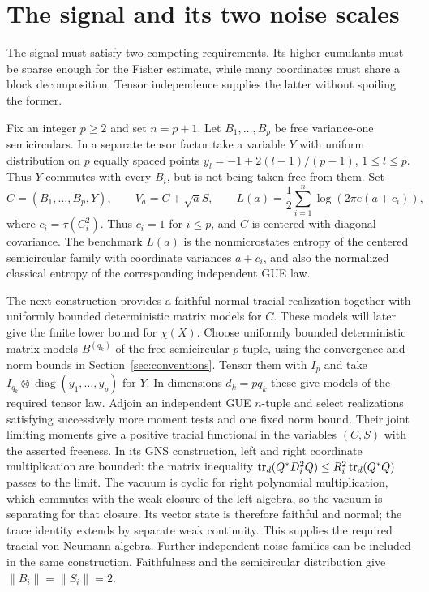 \section{The signal and its two noise scales}\label{sec:signal}

The signal must satisfy two competing requirements. Its higher cumulants
must be sparse enough for the Fisher estimate, while many coordinates
must share a block decomposition. Tensor independence supplies the latter
without spoiling the former.

Fix an integer $p\geq2$ and set $n=p+1$. Let $B_1,\ldots,B_p$ be free
variance-one semicirculars. In a separate tensor factor take a variable
$Y$ with uniform distribution on $p$ equally spaced points
$y_l=-1+2(l-1)/(p-1)$, $1\leq l\leq p$. Thus $Y$ commutes with every
$B_i$, but is not being taken free from them. Set
\[
 C=(B_1,\ldots,B_p,Y),\qquad V_a=C+\sqrt a S,\qquad
 L(a)=\frac12\sum_{i=1}^n\log(2\pi e(a+c_i)),
\]
where $c_i=\tau(C_i^2)$. Thus $c_i=1$ for $i\leq p$, and $C$ is
centered with diagonal covariance.
The benchmark $L(a)$ is the nonmicrostates entropy of the centered
semicircular family with coordinate variances $a+c_i$, and also the
normalized classical entropy of the corresponding independent GUE law.

The next construction provides a faithful normal tracial realization
together with uniformly bounded deterministic matrix models for $C$.
These models will later give the finite lower bound for $\chi(X)$.
Choose uniformly bounded deterministic matrix models
$B^{(q_k)}$ of the free semicircular $p$-tuple, using the convergence and
norm bounds in Section~\ref{sec:conventions}. Tensor them with $I_p$ and
take $I_{q_k}\otimes\operatorname{diag}(y_1,\ldots,y_p)$ for $Y$.
In dimensions $d_k=pq_k$ these give models of the required tensor law.
Adjoin an independent GUE $n$-tuple and select realizations satisfying
successively more moment tests and one fixed norm bound. Their joint
limiting moments give a positive tracial functional in the variables
$(C,S)$ with the asserted freeness. In its GNS construction, left and
right coordinate multiplication are bounded: the matrix inequality
$\operatorname{tr}_d(Q^*D_i^2Q)\leq R_i^2\operatorname{tr}_d(Q^*Q)$ passes to the limit.
The vacuum is cyclic for right polynomial multiplication, which commutes
with the weak closure of the left algebra, so the vacuum is separating
for that closure. Its vector state is therefore faithful and normal;
the trace identity extends by separate weak continuity. This supplies
the required tracial von Neumann algebra. Further independent noise
families can be included in the same construction. Faithfulness and the
semicircular distribution give $\|B_i\|=\|S_i\|=2$.

